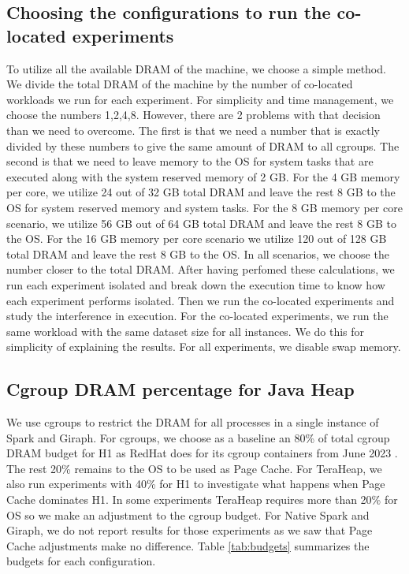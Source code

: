 \subsection{Choosing the configurations to run the co-located experiments}
To utilize all the available DRAM of the machine, we choose a simple method. 
We divide the total DRAM of the machine by the number of co-located workloads we run for each experiment.
For simplicity and time management, we choose the numbers 1,2,4,8. However, there are 2 problems with that decision
than we need to overcome. The first is that we need a number that is exactly divided by these numbers to give the same amount of DRAM to
all cgroups. The second is that we need to leave memory to the OS for system tasks that are executed along with the system reserved memory of 2 GB. For the 4 GB memory per core, we utilize 24 out of 32 GB total DRAM and leave the rest 8 GB to the OS for system reserved memory and system tasks. For the 8 GB memory per core scenario, we utilize 56 GB out of 64 GB total DRAM and leave the rest 8 GB to the OS. For the 16 GB memory per core scenario we utilize 120 out of 128 GB total DRAM and leave the rest 8 GB to the OS. 
In all scenarios, we choose the number closer to the total DRAM. After having perfomed these calculations, we run each experiment isolated and break down the execution time to know how each experiment performs isolated. Then we run the co-located experiments and study the interference in execution. For the co-located experiments, we run the same workload with the same dataset size for all instances. We do this for simplicity of explaining the results. For all experiments, we disable swap memory.

\subsection{Cgroup DRAM percentage for Java Heap}
We use cgroups \cite{cgroups} to restrict the DRAM for all processes in a single instance of Spark and Giraph.
For cgroups, we choose as a baseline an 80\% of total cgroup DRAM budget for H1 as RedHat does for its cgroup containers from June 2023 \cite{redhatblog}.
The rest 20\% remains to the OS to be used as Page Cache.
For TeraHeap, we also run experiments with 40\% for H1 to investigate what happens when Page Cache dominates H1.
In some experiments TeraHeap requires more than 20\% for OS so we make an adjustment to the cgroup budget.
For Native Spark and Giraph, we do not report results for those experiments as we saw that Page Cache adjustments make no difference.
Table \ref{tab:budgets} summarizes the budgets for each configuration.

